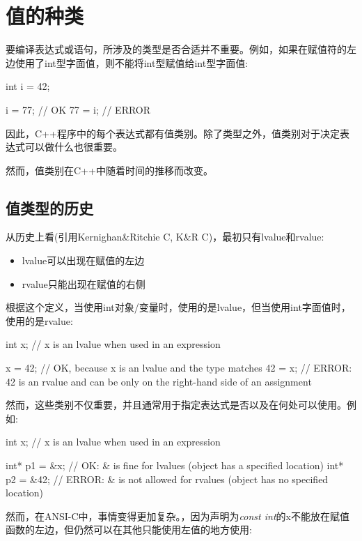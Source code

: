 \section{值的种类}
要编译表达式或语句，所涉及的类型是否合适并不重要。例如，如果在赋值符的左边使用了int型字面值，则不能将int型赋值给int型字面值:

\begin{cppcode}
int i = 42;

i = 77; // OK
77 = i; // ERROR
\end{cppcode}

因此，C++程序中的每个表达式都有值类别。除了类型之外，值类别对于决定表达式可以做什么也很重要。

然而，值类别在C++中随着时间的推移而改变。

\subsection{值类型的历史}

从历史上看(引用Kernighan\&Ritchie C, K\&R C)，最初只有lvalue和rvalue:

\begin{itemize}
	\item lvalue可以出现在赋值的左边
	\item rvalue只能出现在赋值的右侧
\end{itemize}

根据这个定义，当使用int对象/变量时，使用的是lvalue，但当使用int字面值时，使用的是rvalue:

\begin{cppcode}
int x; // x is an lvalue when used in an expression

x = 42; // OK, because x is an lvalue and the type matches
42 = x; // ERROR: 42 is an rvalue and can be only on the right-hand side of an assignment
\end{cppcode}

然而，这些类别不仅重要，并且通常用于指定表达式是否以及在何处可以使用。例如:

\begin{cppcode}
int x; // x is an lvalue when used in an expression

int* p1 = &x; // OK: & is fine for lvalues (object has a specified location)
int* p2 = &42; // ERROR: & is not allowed for rvalues (object has no specified location)
\end{cppcode}

然而，在ANSI-C中，事情变得更加复杂。，因为声明为\textit{const int}的x不能放在赋值函数的左边，但仍然可以在其他只能使用左值的地方使用:

